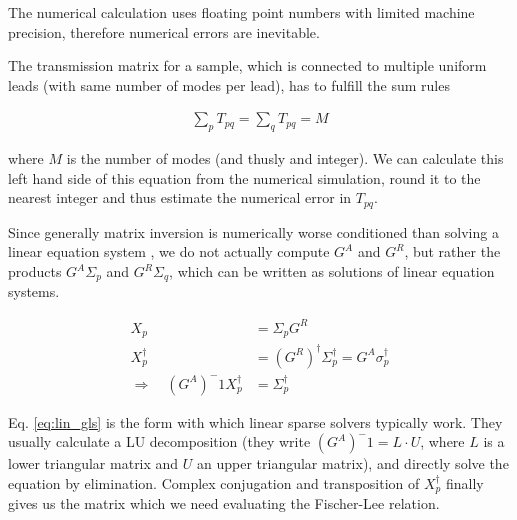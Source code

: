 The numerical
calculation uses floating point numbers with limited machine precision,
therefore numerical errors are inevitable.

The transmission matrix for a sample, which is connected to multiple uniform
leads (with same number of modes per lead), has to fulfill the sum rules

\begin{align}
    \sum_p T_{pq} = \sum_q T_{pq} = M
    \label{eq:sumrule}
\end{align}

where $M$ is the number of modes (and thusly and integer). We can calculate
this left hand side of this equation from the numerical simulation, round it
to the nearest integer and thus estimate the numerical error in $T_{pq}$.

Since generally matrix inversion is numerically worse conditioned than solving
a linear equation system \cite{matrixinversion}, we do not actually compute
$G^A$ and $G^R$, but rather the products $G^A\Sigma_p$ and $G^R\Sigma_q$,
which can be written as solutions of linear equation systems.

\begin{align}
    X_p &= \Sigma_p G^R\\
    X_p^\dagger &= (G^R)^\dagger \Sigma_p^\dagger = G^A \sigma_p^\dagger\\
    \Rightarrow\quad (G^A)^-1 X_p^\dagger &= \Sigma_p^\dagger
    \label{eq:lin_gls}
\end{align}

Eq. \ref{eq:lin_gls} is the form with which linear sparse solvers typically
work. They usually calculate a LU decomposition (they write
$(G^A)^-1 = L \cdot U$, where $L$ is a lower triangular matrix and $U$ an
upper triangular matrix), and directly solve the equation by elimination.
Complex conjugation and transposition of $X_p^\dagger$ finally gives us the
matrix which we need evaluating the Fischer-Lee relation.

